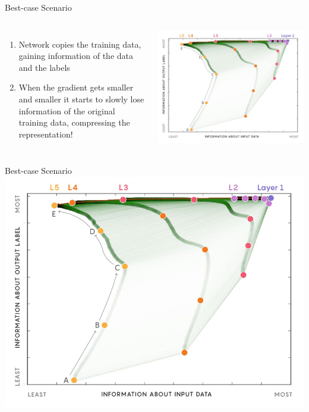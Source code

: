\documentclass{beamer}
\begin{document}
\begin{frame}{Best-case Scenario}
    \begin{columns}
            \begin{enumerate}
                \item {
                    Network copies the training data, gaining information of the data and the labels
                }
                \item {
                    When the gradient gets smaller and smaller it starts to slowly lose information of the original training data, compressing the representation!
                }
            \end{enumerate}
            \includegraphics[scale=0.4]{DeepLearning_5001_crop.jpg}
            \cite{Article}
    \end{columns}
\end{frame}

\begin{frame}{Best-case Scenario}
    \centering
        \includegraphics[scale=0.6]{DeepLearning_5001_crop.jpg}
        \cite{Article}
\end{frame}
\end{document}

